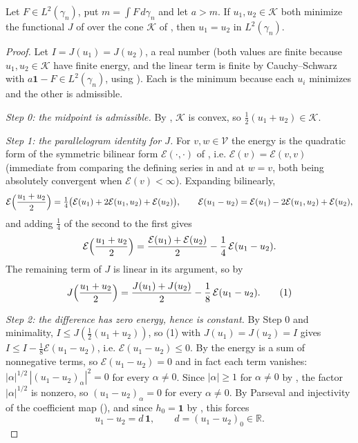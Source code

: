 \begin{lemma}
Let $F \in L^2(\gamma_n)$, put $m = \int F \, d\gamma_n$ and let $a > m$.  If
$u_1, u_2 \in \mathcal{K}$ both minimize the functional $J$ of
 over the cone $\mathcal{K}$ of
, then $u_1 = u_2$ in $L^2(\gamma_n)$.
\end{lemma}
\begin{proof}
Let $I = J(u_1) = J(u_2)$, a real number (both values are finite because
$u_1,u_2 \in \mathcal{K}$ have finite energy, and the linear term is finite by
Cauchy--Schwarz with $a\mathbf{1} - F \in L^2(\gamma_n)$, using
).  Each is the minimum because each $u_i$ minimizes and the
other is admissible.

\emph{Step 0: the midpoint is admissible.}
By , $\mathcal{K}$ is convex, so
$\tfrac12(u_1+u_2) \in \mathcal{K}$.

\emph{Step 1: the parallelogram identity for $J$.}
For $v, w \in \mathcal{V}$ the energy is the quadratic form of the symmetric
bilinear form $\mathcal{E}(\cdot,\cdot)$ of , i.e.
$\mathcal{E}(v) = \mathcal{E}(v,v)$ (immediate from comparing the defining series
in  and  at $w = v$, both being absolutely
convergent when $\mathcal{E}(v) < \infty$).  Expanding bilinearly,
\[
  \mathcal{E}\Bigl(\frac{u_1+u_2}{2}\Bigr)
    = \tfrac14\bigl(\mathcal{E}(u_1) + 2\mathcal{E}(u_1,u_2) + \mathcal{E}(u_2)\bigr),
  \qquad
  \mathcal{E}(u_1 - u_2)
    = \mathcal{E}(u_1) - 2\mathcal{E}(u_1,u_2) + \mathcal{E}(u_2),
\]
and adding $\tfrac14$ of the second to the first gives
\[
  \mathcal{E}\Bigl(\frac{u_1+u_2}{2}\Bigr)
    = \frac{\mathcal{E}(u_1)+\mathcal{E}(u_2)}{2}
      - \frac{1}{4}\,\mathcal{E}(u_1-u_2).
\]
The remaining term of $J$ is linear in its argument, so by
\begin{equation*}
  J\Bigl(\frac{u_1+u_2}{2}\Bigr)
    = \frac{J(u_1)+J(u_2)}{2} - \frac18\,\mathcal{E}(u_1-u_2). \tag{1}
\end{equation*}

\emph{Step 2: the difference has zero energy, hence is constant.}
By Step 0 and minimality, $I \leq J(\tfrac12(u_1+u_2))$, so (1) with
$J(u_1)=J(u_2)=I$ gives $I \leq I - \tfrac18\mathcal{E}(u_1-u_2)$, i.e.
$\mathcal{E}(u_1-u_2) \leq 0$.  By  the energy is a sum of
nonnegative terms, so $\mathcal{E}(u_1-u_2) = 0$ and in fact each term vanishes:
$|\alpha|^{1/2}\,|(u_1-u_2)_\alpha|^2 = 0$ for every $\alpha \neq 0$.  Since
$|\alpha| \geq 1$ for $\alpha \neq 0$ by , the factor
$|\alpha|^{1/2}$ is nonzero, so $(u_1-u_2)_\alpha = 0$ for every $\alpha \neq 0$.
By Parseval and injectivity of the coefficient map (), and
since $h_0 = \mathbf{1}$ by , this forces
\[
  u_1 - u_2 = d\,\mathbf{1}, \qquad d = (u_1-u_2)_0 \in \mathbb{R}.
\]


\end{proof}
